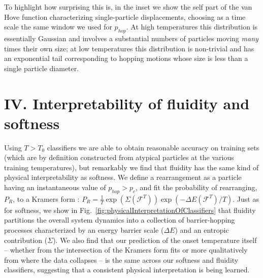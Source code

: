 \documentclass[aps,reprint,superscriptaddress,nofootinbib, notitlepage,prl]{revtex4-2}
\begin{document}
To highlight how surprising this is, in the inset we show the self part of the van Hove function characterizing single-particle displacements, choosing as a time scale the same window we used for $p_{hop}$. At high temperatures this distribution is essentially Gaussian and involves a substantial numbers of particles moving \emph{many} times their own size; at low temperatures this distribution is non-trivial and has an exponential tail corresponding to hopping motions whose size is less than a single particle diameter.

\section{IV. Interpretability of fluidity and softness}

Using $T>T_0$ classifiers we are able to obtain reasonable accuracy on training sets (which are by definition constructed from atypical particles at the various training temperatures), but remarkably we find that fluidity has the same kind of physical interpretability as softness. We define a rearrangement as a particle having an instantaneous value of $p_{hop}>p_c$, and fit the probability of rearranging, $P_R$, to a Kramers form \cite{hanggi1990reaction}: $P_R=\frac{1}{T}\exp\left( \Sigma(\mathcal{F}^T)\right) \exp \left(- \Delta E(\mathcal{F}^T)/T\right)$. Just as for softness, we show in Fig.~\ref{fig:physicalInterpretationOfClassifiers} that fluidity partitions the overall system dynamics into a collection of barrier-hopping processes characterized by an energy barrier scale ($\Delta E$) and an entropic contribution ($\Sigma$).  We also find that our prediction of the onset temperature itself -- whether from the intersection of the Kramers form fits or more qualitatively from where the data collapses -- is the same across our softness and fluidity classifiers, suggesting that a consistent physical interpretation is being learned.
\end{document}
